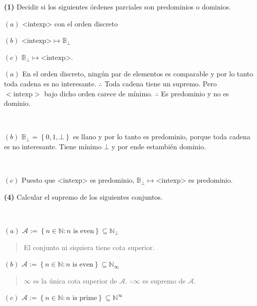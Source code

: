 \documentclass[article, 12pt]{article}
\begin{document}
\begin{myframe}
\textbf{(1)} Decidir si los siguientes órdenes parciales son predominios o
dominios.

$(a)$ <intexp> con el orden discreto

$(b)$ $\text{<intexp>} \mapsto
\mathbb{B}_{\bot}$

$(c)$ $\mathbb{B}_\bot \mapsto \text{<intexp>}$.
\end{myframe}

$(a)$ En el orden discreto, ningún par de elementos es comparable y por lo tanto
toda cadena es no interesante. $\therefore $ Toda cadena tiene un supremo. Pero
$<\text{intexp}>$ bajo dicho orden carece de mínimo. $\therefore $ Es
predominio y no es dominio.

~


$(b)$ $\mathbb{B}_\bot = \left\{ 0,1, \bot  \right\} $ es llano y por lo tanto
es predominio, porque toda cadena es no interesante. Tiene mínimo $\bot$ y por
ende estambién dominio.

~

$(c)$ Puesto que $\text{<intexp>}$ es predominio,
$\mathbb{B}_\bot \mapsto \text{<intexp>}$ es predominio.


\pagebreak 

\begin{myframe}
\textbf{(4)} Calcular el supremo de los siguientes conjuntos.
\end{myframe}

~ 

$(a)$ $\mathcal{A} := \left\{ n \in \mathbb{N} : n \text{ is even} \right\}
\subseteq \mathbb{N}_{\bot} $


\small
\begin{quote}

  El conjunto ni siquiera tiene cota superior. 

\end{quote}
\normalsize

$(b)$ $\mathcal{A} := \left\{ n \in \mathbb{N} : n \text{ is even} \right\}
\subseteq \mathbb{N}_{\infty} $


\small
\begin{quote}

$\infty $ es la única cota superior de $\mathcal{A}$. $\therefore \infty$ es
supremo de $\mathcal{A}$.

\end{quote}
\normalsize


$(c)$ $\mathcal{A} := \left\{ n \in \mathbb{N} : n \text{ is prime} \right\}
\subseteq \mathbb{N}^\infty$
\end{document}
